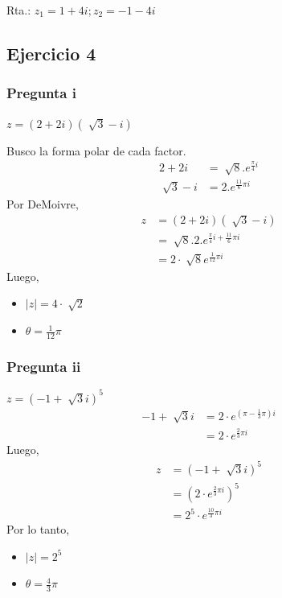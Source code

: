 Rta.: $ z_1 = 1+4i; z_2 = -1-4i $

\subsection{Ejercicio 4}

\subsubsection{Pregunta i}

$ z = (2+2i)(\sqrt[]{3}-i) $

Busco la forma polar de cada factor.
\begin{align*}
    2+2i &= \sqrt[]{8}. e^{\frac{\pi}{4}i} \\
    \sqrt[]{3} - i &= 2.e^{\frac{11}{6}\pi i}
\end{align*}
Por DeMoivre,
\begin{align*}
    z &= (2+2i)(\sqrt[]{3}-i) \\
    &= \sqrt[]{8}. 2. e^{\frac{\pi}{4}i + \frac{11}{6}\pi i} \\
    &= 2 \cdot \sqrt[]{8} e^{\frac{1}{12}\pi i}
\end{align*}
Luego,
\begin{itemize}
    \item $ |z| = 4\cdot \sqrt[]{2} $
    \item $ \theta = \frac{1}{12}\pi $
\end{itemize}

\subsubsection{Pregunta ii}

$ z = (-1+\sqrt[]{3}i)^5 $
\begin{align*}
    -1+\sqrt[]{3}i &= 2\cdot e^{(\pi - \frac{1}{3}\pi)i} \\
    &= 2\cdot e^{\frac{2}{3}\pi i } 
\end{align*}
Luego,
\begin{align*}
    z &= (-1+\sqrt[]{3}i)^5 \\
    &= (2\cdot e^{\frac{2}{3}\pi i })^5 \\
    &= 2^5\cdot e^{\frac{10}{3}\pi i }
\end{align*}
Por lo tanto,
\begin{itemize}
    \item $ |z| = 2^5 $
    \item $ \theta = \frac{4}{3}\pi $
\end{itemize}

